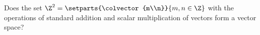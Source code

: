 %
Does the set $\Z^2 = \setparts{\colvector{m\\n}}{m,n\in\Z}$ with the operations of standard addition and scalar multiplication of vectors form a vector space?